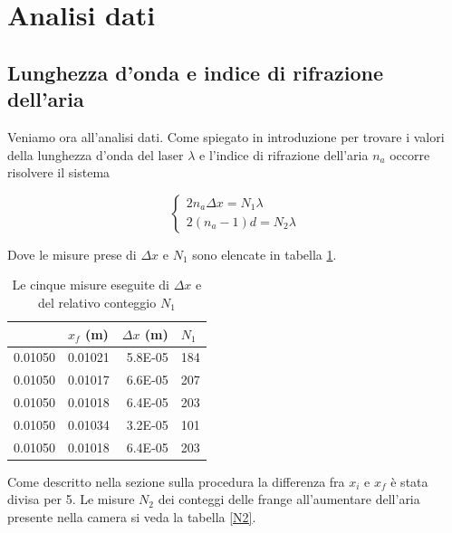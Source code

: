 \documentclass[a4paper,11pt]{article}
\begin{document}
\section{Analisi dati}

\subsection{Lunghezza d'onda e indice di rifrazione dell'aria}
Veniamo ora all'analisi dati. Come spiegato in introduzione per trovare i valori della lunghezza d'onda del laser $\lambda$ e l'indice di rifrazione dell'aria $n _a$ occorre risolvere il sistema

\begin{equation}
\begin{cases}
2n _a \Delta x = N _1 \lambda \\ 2(n_a -1)d =N_2 \lambda
\end{cases}	
\end{equation}

Dove le misure prese di $\Delta x$ e $N _1$ sono elencate in tabella \ref{deltax}.

\begin{table}[htbp]
	\centering
	\caption{Le cinque misure eseguite di $\Delta x$ e del relativo conteggio $N _1$}
	\begin{tabular}{rrrr}
		\bottomrule
		\rowcolor[rgb]{ .267,  .447,  .769} \multicolumn{1}{l}{\textcolor[rgb]{ 1,  1,  1}{\textbf{$x _i$ (m)}}} & \multicolumn{1}{l}{\textcolor[rgb]{ 1,  1,  1}{\textbf{$x _f$ (m)}}} & \multicolumn{1}{l}{\textcolor[rgb]{ 1,  1,  1}{\textbf{$\Delta x$ (m)}}} & \multicolumn{1}{l}{\textcolor[rgb]{ 1,  1,  1}{\textbf{$N _1$}}} \\
		\toprule
		\rowcolor[rgb]{ .851,  .851,  .851} 0.01050 & 0.01021 & 5.8E-05 & 184 \\
		0.01050 & 0.01017 & 6.6E-05 & 207 \\
		\rowcolor[rgb]{ .851,  .851,  .851} 0.01050 & 0.01018 & 6.4E-05 & 203 \\
		0.01050 & 0.01034 & 3.2E-05 & 101 \\
		\rowcolor[rgb]{ .851,  .851,  .851} 0.01050 & 0.01018 & 6.4E-05 & 203 \\
		\toprule
	\end{tabular}%
	\label{deltax}%
\end{table}%

Come descritto nella sezione sulla procedura la differenza fra $x _i$ e $x _f$ è stata divisa per 5. Le misure $N _2$ dei conteggi delle frange all'aumentare dell'aria presente nella camera si veda la tabella \ref{N2}.
\end{document}
